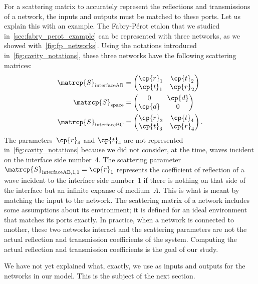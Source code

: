 \begin{refsection}
For a scattering matrix to accurately represent the reflections and transmissions of a network, the inputs and outputs must be matched to these ports.
Let us explain this with an example.
The Fabry-Pérot etalon that we studied in~\cref{sec:fabry_perot_example} can be represented with three networks, as we showed with~\cref{fig:fp_networks}.
Using the notations introduced in~\vref{fig:cavity_notations},
these three networks have the following scattering matrices:
\begin{align}
    \matrcp{S}_\text{interfaceAB}
    &=
    \begin{pmatrix}
        \cp{r}_1 & \cp{t}_2 \\
        \cp{t}_1 & \cp{r}_2
    \end{pmatrix}
    \\
    \matrcp{S}_\text{space}
    &=
    \begin{pmatrix}
        0      & \cp{d} \\
        \cp{d} & 0
    \end{pmatrix}
    \\
    \matrcp{S}_\text{interfaceBC}
    &=
    \begin{pmatrix}
        \cp{r}_3 & \cp{t}_4 \\
        \cp{t}_3 & \cp{r}_4
    \end{pmatrix}
    \text{.}
\end{align}
The parameters~$\cp{r}_4$ and $\cp{t}_4$ are not represented in~\cref{fig:cavity_notations}
because we did not consider, at the time, waves incident on the interface side number~4.
The scattering parameter $\matrcp{S}_\text{interfaceAB,1,1} = \cp{r}_1$ represents the coefficient of reflection of a wave incident to the interface side number~1 if there is nothing on that side of the interface but an infinite expanse of medium~$A$.
This is what is meant by matching the input to the network.
The scattering matrix of a network includes some assumptions about its environment;
it is defined for an ideal environment that matches its ports exactly.
In practice, when a network is connected to another, these two networks interact and the scattering parameters are not the actual reflection and transmission coefficients of the system.
Computing the actual reflection and transmission coefficients is the goal of our study.

We have not yet explained what, exactly, we use as inputs and outputs for the networks in our model.
This is the subject of the next section.





\end{refsection}
